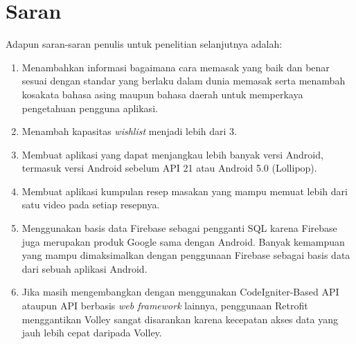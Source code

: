 \section{Saran}
	Adapun saran-saran penulis untuk penelitian selanjutnya adalah:
	\begin{enumerate}
		\item Menambahkan informasi bagaimana cara memasak yang baik dan benar sesuai dengan standar yang berlaku dalam dunia memasak serta menambah kosakata bahasa asing maupun bahasa daerah untuk memperkaya pengetahuan pengguna aplikasi. 
		
		\item Menambah kapasitas \textit{wishlist} menjadi lebih dari 3.
		
		\item Membuat aplikasi yang dapat menjangkau lebih banyak versi Android, termasuk versi Android sebelum API 21 atau Android 5.0 (Lollipop). 
		
		\item Membuat aplikasi kumpulan resep masakan yang mampu memuat lebih dari satu video pada setiap resepnya.
		
		\item Menggunakan basis data Firebase sebagai pengganti SQL karena Firebase juga merupakan produk Google sama dengan Android. Banyak kemampuan yang mampu dimaksimalkan dengan penggunaan Firebase sebagai basis data dari sebuah aplikasi Android.
		
		\item Jika masih mengembangkan dengan menggunakan CodeIgniter-Based API ataupun API berbasis \textit{web framework} lainnya, penggunaan Retrofit menggantikan Volley sangat disarankan karena kecepatan akses data yang jauh lebih cepat daripada Volley. 

	\end{enumerate}

	
\begin{comment}

\end{comment}
